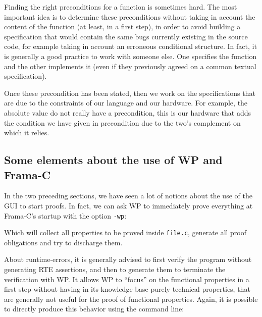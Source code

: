 \documentclass[12pt,francais,]{scrbook}
\newenvironment{Shaded}{}{}
\newcommand{\KeywordTok}[1]{\textcolor[rgb]{0.00,0.44,0.13}{\textbf{{#1}}}}
\newcommand{\NormalTok}[1]{{#1}}
\begin{document}
Finding the right preconditions for a function is sometimes hard. The
most important idea is to determine these preconditions without taking
in account the content of the function (at least, in a first step), in
order to avoid building a specification that would contain the same bugs
currently existing in the source code, for example taking in account an
erroneous conditional structure. In fact, it is generally a good
practice to work with someone else. One specifies the function and the
other implements it (even if they previously agreed on a common textual
specification).

Once these precondition has been stated, then we work on the
specifications that are due to the constraints of our language and our
hardware. For example, the absolute value do not really have a
precondition, this is our hardware that adds the condition we have given
in precondition due to the two's complement on which it relies.

\subsection{Some elements about the use of WP and
Frama-C}\label{some-elements-about-the-use-of-wp-and-frama-c}

In the two preceding sections, we have seen a lot of notions about the
use of the GUI to start proofs. In fact, we can ask WP to immediately
prove everything at Frama-C's startup with the option \texttt{-wp}:

\begin{footnotesize}\begin{Shaded}
\end{Shaded}\end{footnotesize}

Which will collect all properties to be proved inside \texttt{file.c},
generate all proof obligations and try to discharge them.

About runtime-errors, it is generally advised to first verify the
program without generating RTE assertions, and then to generate them to
terminate the verification with WP. It allows WP to ``focus'' on the
functional properties in a first step without having in its knowledge
base purely technical properties, that are generally not useful for the
proof of functional properties. Again, it is possible to directly
produce this behavior using the command line:
\end{document}
